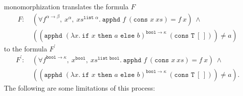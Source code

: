 \documentclass{article}
\begin{document}
		monomorphization translates the formula $F$
		\begin{align*}
			F:\ &(\forall f^{\alpha \to \beta},\ 
			x^{\alpha},\ xs^{\texttt{list }\alpha}.\ 
			\texttt{apphd }f\ (\texttt{cons }x
			\ xs) = f\ x)\ \land\ \\
			&((\texttt{apphd }(\lambda x.\ 
			\texttt{if }x \texttt{ then }a 
			\texttt{ else } b)^{\texttt{bool} 
			\to \kappa}\ (\texttt{cons T}\ [\ ])) 
			\neq a)
		\end{align*}
		to the formula $F^{\prime}$
		\begin{align*}
			F^{\prime}:\ &(\forall 
			f^{\texttt{bool} \to \kappa},\ 
			x^{\texttt{bool}},\ 
			xs^{\texttt{list bool}}.\ 
			\texttt{apphd }f\ (\texttt{cons }x
			\ xs) = f\ x) \ \land\ \\
			&((\texttt{apphd } (\lambda x.\ 
			\texttt{if }x \texttt{ then }a 
			\texttt{ else } b)^{\texttt{bool} 
			\to \kappa}\ (\texttt{cons T}\ 
			[\ ])) \neq a).
		\end{align*}
		\noindent The following are some 
		limitations of this process:
\end{document}

